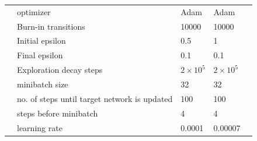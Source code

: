 \documentclass[12pt]{article}
\begin{document}
\begin{tcolorbox}[fit,height=22cm, width=\textwidth, blank, borderline={1pt}{-2pt},nobeforeafter]
\begin{table}[H]
\begin{tabular}{|c|p{7.785em}|l|l|r|}
			\cline{2-5}          & optimizer & \multicolumn{1}{p{7.93em}|}{Adam} & \multicolumn{1}{p{7.93em}|}{Adam} &  \\
			\cline{2-5}          & Burn-in transitions & 10000 & 10000 &  \\
			\cline{2-5}          & Initial epsilon & 0.5   & 1     &  \\
			\cline{2-5}          & Final epsilon & 0.1   & 0.1   &  \\
			\cline{2-5}          & Exploration decay steps & \multicolumn{1}{p{7.93em}|}{$2\times10^5$} & \multicolumn{1}{p{7.93em}|}{$2\times10^5$} &  \\
			\cline{2-5}          & minibatch size & 32    & 32    &  \\
			\cline{2-5}          & no. of steps until target network is updated & 100   & 100   &  \\
			\cline{2-5}          & steps before minibatch & 4     & 4     &  \\
			\cline{2-5}          & learning rate & 0.0001 & 0.00007 &  \\
			\hline
		\end{tabular}%
		\label{tab1}%
	\end{table}%
     
    \end{tcolorbox}
\end{document}
